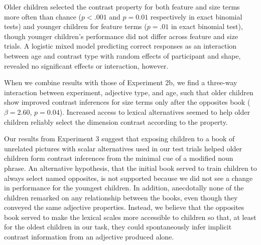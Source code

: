 \documentclass[10pt,letterpaper]{article}
\begin{document}
Older children selected the contrast property for both feature and size terms more often than chance ($p < .001$ and $p = 0.01$ respectively in exact binomial tests) and younger children for feature terms ($p = .01$ in exact binomial test), though younger children's performance did not differ across feature and size trials.  A logistic mixed model predicting correct responses as an interaction between age and contrast type with random effects of participant and shape, revealed no significant effects or interaction, however.

When we combine results with those of Experiment 2b, we find a three-way interaction between experiment, adjective type, and age, such that older children show improved contrast inferences for size terms only after the opposites book ($\beta = 2.60$, $p = 0.04$).  Increased access to lexical alternatives seemed to help older children reliably select the dimension contrast according to the property.  

Our results from Experiment 3 suggest that exposing children to a book of unrelated pictures with scalar alternatives used in our test trials helped older children form contrast inferences from the minimal cue of a modified noun phrase.  An alternative hypothesis, that the initial book served to train children to always select named opposites, is not supported because we did not see a change in performance for the youngest children.  In addition, anecdotally none of the children remarked on any relationship between the books, even though they conveyed the same adjective properties.  Instead, we believe that the opposites book served to make the lexical scales more accessible to children so that, at least for the oldest children in our task, they could spontaneously infer implicit contrast information from an adjective produced alone.   

\end{document}
